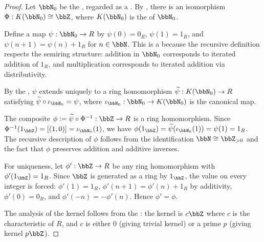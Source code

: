 \begin{proof}
    Let $\bbN_0$ be the , regarded as a . By , there is an isomorphism $\Phi: K(\bbN_0) \cong \bbZ$, where $K(\bbN_0)$ is the  of $\bbN_0$.

    Define a map $\psi: \bbN_0 \to R$ by $\psi(0) = 0_R$, $\psi(1) = 1_R$, and $\psi(n+1) = \psi(n) + 1_R$ for $n \in \bbN$. This is a  because the recursive definition respects the semiring structure: addition in $\bbN_0$ corresponds to iterated addition of $1_R$, and multiplication corresponds to iterated addition via distributivity.

    By the , $\psi$ extends uniquely to a ring homomorphism $\widetilde{\psi}: K(\bbN_0) \to R$ satisfying $\widetilde{\psi} \circ \iota_{\bbN_0} = \psi$, where $\iota_{\bbN_0}: \bbN_0 \to K(\bbN_0)$ is the canonical map.

    The composite $\phi := \widetilde{\psi} \circ \Phi^{-1}: \bbZ \to R$ is a ring homomorphism. Since $\Phi^{-1}(1_\bbZ) = [(1,0)] = \iota_{\bbN_0}(1)$, we have $\phi(1_\bbZ) = \widetilde{\psi}(\iota_{\bbN_0}(1)) = \psi(1) = 1_R$. The recursive description of $\phi$ follows from the identification $\bbN \cong \bbZ_{> 0}$ and the fact that $\phi$ preserves addition and additive inverses.

    For uniqueness, let $\phi': \bbZ \to R$ be any ring homomorphism with $\phi'(1_\bbZ) = 1_R$. Since $\bbZ$ is generated as a ring by $1_\bbZ$, the value on every integer is forced: $\phi'(1) = 1_R$, $\phi'(n+1) = \phi'(n) + 1_R$ by additivity, $\phi'(0) = 0_R$, and $\phi'(-n) = -\phi'(n)$. Hence $\phi' = \phi$.

    The analysis of the kernel follows from the : the kernel is $c\bbZ$ where $c$ is the characteristic of $R$, and $c$ is either $0$ (giving trivial kernel) or a prime $p$ (giving kernel $p\bbZ$).
\end{proof}